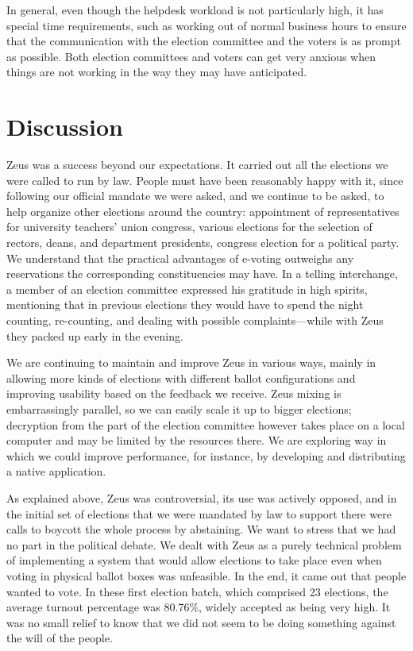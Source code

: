 \documentclass[letterpaper,10pt]{article}
\begin{document}
In general, even though the helpdesk workload is not particularly
high, it has special time requirements, such as working out of normal
business hours to ensure that the communication with the election
committee and the voters is as prompt as possible. Both election
committees and voters can get very anxious when things are not working
in the way they may have anticipated.



\section{Discussion}
\label{sec:discussion}

Zeus was a success beyond our expectations. It carried out all the
elections we were called to run by law. People must have been
reasonably happy with it, since following our official mandate we were
asked, and we continue to be asked, to help organize other elections
around the country: appointment of representatives for university
teachers' union congress, various elections for the selection of
rectors, deans, and department presidents, congress election for a
political party. We understand that the practical advantages of
e-voting outweighs any reservations the corresponding constituencies
may have. In a telling interchange, a member of an election committee
expressed his gratitude in high spirits, mentioning that in previous
elections they would have to spend the night counting, re-counting,
and dealing with possible complaints---while with Zeus they packed up
early in the evening.

We are continuing to maintain and improve Zeus in various ways, mainly
in allowing more kinds of elections with different ballot
configurations and improving usability based on the feedback we
receive. Zeus mixing is embarrassingly parallel, so we can easily scale
it up to bigger elections; decryption from the part of the election
committee however takes place on a local computer and may be limited
by the resources there. We are exploring way in which we could improve
performance, for instance, by developing and distributing a native
application.

As explained above, Zeus was controversial, its use was actively
opposed, and in the initial set of elections that we were mandated by
law to support there were calls to boycott the whole process by
abstaining. We want to stress that we had no part in the political
debate. We dealt with Zeus as a purely technical problem of
implementing a system that would allow elections to take place even
when voting in physical ballot boxes was unfeasible. In the end, it
came out that people wanted to vote. In these first election batch,
which comprised 23 elections, the average turnout percentage was
80.76\%, widely accepted as being very high. It was no small relief to
know that we did not seem to be doing something against the will of
the people.
\end{document}

